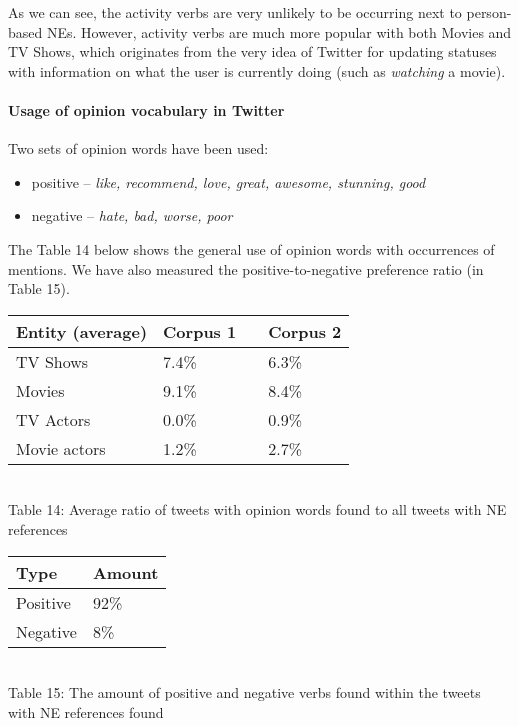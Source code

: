 As we can see, the activity verbs are very unlikely to be occurring next to
person-based NEs. However, activity verbs are much more popular with both
Movies and TV Shows, which originates from the very idea of Twitter for
updating statuses with information on what the user is currently doing (such as \textit{watching}
a movie).

\paragraph{Usage of opinion vocabulary in Twitter}
Two sets of opinion words have been used:
\begin{itemize}
  \item positive -- \textit{like, recommend, love, great, awesome, stunning, good}
  \item negative -- \textit{hate, bad, worse, poor}
\end{itemize}

The Table 14 below shows the general use of opinion words with occurrences of
mentions. We have also measured the positive-to-negative preference ratio (in Table 15).

\begin{center}
  \begin{tabular}{ | p{4cm} | p{2cm} | p{1cm}| p{2cm} | } \hline
    Entity (average) & Corpus 1 & & Corpus 2 \\ \hline
    TV Shows & 7.4\% & & 6.3\% \\ \hline
    Movies & 9.1\% & & 8.4\% \\ \hline
    TV Actors & 0.0\% & & 0.9\% \\ \hline
    Movie actors & 1.2\% & & 2.7\% \\ \hline
  \end{tabular} \\
  Table 14: Average ratio of tweets with opinion words found to all tweets with NE references \\
\end{center}

\begin{center}
  \begin{tabular}{ | p{3cm}| p{2cm} | } \hline
    Type & Amount \\ \hline
    Positive & 92\% \\ \hline
    Negative & 8\% \\ \hline
  \end{tabular} \\
  Table 15: The amount of positive and negative verbs found within the tweets with NE references found \\
\end{center}

